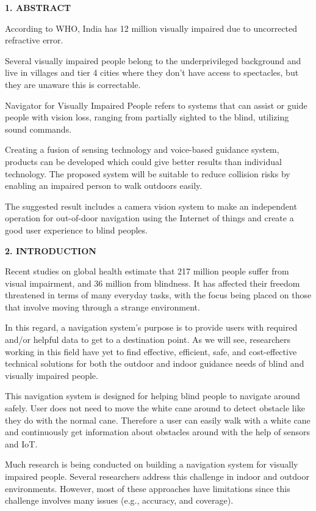 \documentclass{article}
\begin{document}
\textbf{1. ABSTRACT}

According to WHO, India has 12 million visually impaired due to
uncorrected refractive error.

Several visually impaired people belong to the underprivileged
background and live in villages and tier 4 cities where they don't have
access to spectacles, but they are unaware this is correctable.

Navigator for Visually Impaired People refers to systems that can assist
or guide people with vision loss, ranging from partially sighted to the
blind, utilizing sound commands.

Creating a fusion of sensing technology and voice-based guidance system,
products can be developed which could give better results than
individual technology. The proposed system will be suitable to reduce
collision risks by enabling an impaired person to walk outdoors easily.

The suggested result includes a camera vision system to make an
independent operation for out-of-door navigation using the Internet of
things and create a good user experience to blind peoples.

\textbf{2. INTRODUCTION}

Recent studies on global health estimate that 217 million people suffer
from visual impairment, and 36 million from blindness. It has affected
their freedom threatened in terms of many everyday tasks, with the focus
being placed on those that involve moving through a strange environment.

In this regard, a navigation system's purpose is to provide users with
required and/or helpful data to get to a destination point. As we will
see, researchers working in this field have yet to find effective,
efficient, safe, and cost-effective technical solutions for both the
outdoor and indoor guidance needs of blind and visually impaired people.

This navigation system is designed for helping blind people to navigate
around safely. User does not need to move the white cane around to
detect obstacle like they do with the normal cane. Therefore a user can
easily walk with a white cane and continuously get information about
obstacles around with the help of sensors and IoT.

Much research is being conducted on building a navigation system for
visually impaired people. Several researchers address this challenge in
indoor and outdoor environments. However, most of these approaches have
limitations since this challenge involves many issues (e.g., accuracy,
and coverage).
\end{document}
